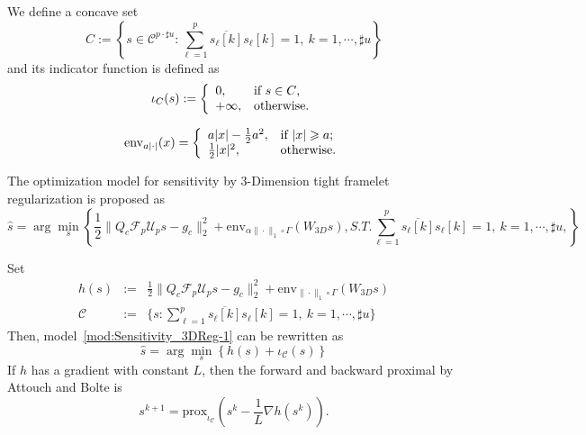 \documentclass[preprint]{elsarticle}
\renewcommand{\ge}{\geqslant}
\renewcommand{\ge}{\geqslant}
\begin{document}
We define a  concave set $$C:=\left\{s\in \mathcal{C}^{p \cdot\sharp u }:\sum_{\ell=1}^p \overline{s_{\ell}[k]}s_{\ell}[k] =1,\:k=1,\cdots,\sharp u \right\}$$
and its indicator function is defined as
$$
\iota_C(s): =\left\{
               \begin{array}{ll}
                 0, & \hbox{if $s\in C$,} \\
                 +\infty, & \hbox{otherwise.}
               \end{array}
             \right.
$$

\begin{equation}\label{eq:abs-envelope}
\mathrm{env}_{a |\cdot|} (x)=\left\{
                          \begin{array}{ll}
                            a |x|-\frac{1}{2}a^2, & \hbox{if $|x| \ge a$;} \\
                            \frac{1}{2}|x|^2, & \hbox{otherwise.}
                          \end{array}
                                                             \right.
\end{equation}

The optimization model for sensitivity by 3-Dimension tight framelet regularization is proposed as
\begin{equation}\label{mod:Sensitivity_3DReg-1}
 \hat{s} = \arg\min_{s}\left\{ \frac{1}{2}\| Q_{c}\mathcal{F}_p \mathcal{U}_p s - g_c \|_{2}^{2}+\mathrm{env}_{\alpha \|\cdot\|_1\circ \Gamma} ( W_{3D}s), S.T. \sum_{\ell=1}^p \overline{s_{\ell}[k]}s_{\ell}[k] =1,\:k=1,\cdots,\sharp u,  \right\}
\end{equation}

Set
\begin{eqnarray*}
h(s)&:=& \frac{1}{2}\| Q_{c}\mathcal{F}_p \mathcal{U}_p s - g_c \|_{2}^{2}+\mathrm{env}_{\|\cdot\|_1\circ \Gamma} ( W_{3D}s) \\
\mathcal{C}&:=& \{s: \sum_{\ell=1}^p \overline{s_{\ell}[k]}s_{\ell}[k] =1,\:k=1,\cdots,\sharp u\}
\end{eqnarray*}
Then, model~\eqref{mod:Sensitivity_3DReg-1} can be rewritten as
\begin{equation}\label{mod:Sensitivity_3DReg-2}
\hat{s} = \arg\min_{s}\left\{ h(s)+\iota_\mathcal{C}(s) \right\}
\end{equation}
If $h$ has a gradient with constant $L$, then the forward and backward proximal by Attouch and Bolte is
$$
s^{k+1}=\mathrm{prox}_{\iota_\mathcal{C}}(s^k-\frac{1}{L} \nabla h(s^k)).
$$
\end{document}
